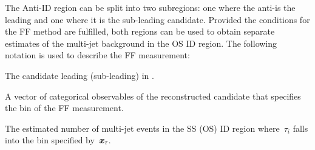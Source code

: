{%
  \newcommand*{\ffargs}{\ensuremath{( \myvec{x}_{\tau} )}\xspace}

  \newcommand*{\NmjID}[2]{\ensuremath{N_\text{multi-jet}^{\text{#1, loose }\tau_{#2}}}\xspace}
  \newcommand*{\NmjIDIncl}[1]{\ensuremath{N_\text{multi-jet}^{\text{#1, ID}}}\xspace}

  \newcommand*{\NmjAntiIDIncl}[1]{\ensuremath{N_\text{multi-jet}^{\text{#1, Anti-ID}}}\xspace}
  \newcommand*{\NmjAntiID}[2]{\ensuremath{N_\text{multi-jet}^{\text{#1, anti-}\tau_{#2}}}\xspace}

  The Anti-ID region can be split into two subregions: one where the
  anti-\tauhadvis is the leading and one where it is the sub-leading \tauhadvis
  candidate. Provided the conditions for the FF method are fulfilled, both
  regions can be used to obtain separate estimates of the multi-jet background
  in the OS ID region. The following notation is used to describe the FF
  measurement:
  \begin{description}[style=standard]
  \item[$\tau_0$ ($\tau_1$)] The \tauhadvis candidate leading (sub-leading) in \pT.

  \item[$\myvec{x}_\tau$] A vector of categorical observables of the
    reconstructed \tauhadvis candidate that specifies the bin of the FF
    measurement.

  \item[$\NmjID{SS(OS)}{i}\ffargs$] The estimated number of multi-jet events in
    the SS (OS) ID region where~$\tau_i$ falls into the bin specified
    by~$\myvec{x}_\tau$.


\end{description}}
